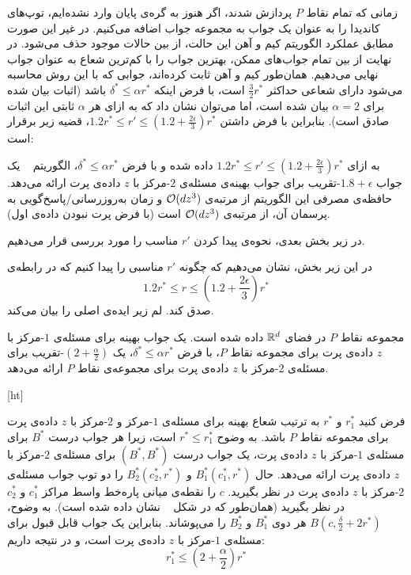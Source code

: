 زمانی که تمام نقاط $P$ پردازش شدند، اگر هنوز به گره‌ی پایان وارد نشده‌ایم، توپ‌های کاندیدا را به عنوان یک جواب به مجموعه جواب اضافه می‌کنیم. در غیر این صورت مطابق عملکرد الگوریتم کیم و آهن این حالت، از بین حالات موجود حذف می‌شود. در نهایت از بین تمام جواب‌های ممکن، بهترین جواب را با کم‌ترین شعاع به عنوان جواب نهایی می‌دهیم. همان‌طور کیم و آهن  ثابت کرده‌اند، جوابی که با این روش محاسبه می‌شود دارای شعاعی حداکثر $\frac{3}{2}r^*$ است، با فرض اینکه $\delta^* \leq \alpha r^*$ باشد (اثبات بیان شده برای $\alpha = 2$ بیان شده است، اما می‌توان نشان داد که به ازای هر $\alpha$ ثابتی این اثبات صادق است). بنابراین با فرض داشتن $1.2r^* \leq r' \leq (1.2 + \frac{2\epsilon}{3})r^*$، قضیه زیر برقرار است:


به ازای $1.2r^* \leq r' \leq (1.2 + \frac{2\epsilon}{3})r^*$ داده شده و با فرض $\delta^* \leq \alpha r^*$، الگوریتم ~ یک جواب $1.8 + \epsilon$-تقریب برای جواب بهینه‌ی مسئله‌ی $2$-مرکز با $z$ داده‌ی پرت ارائه می‌دهد. حافظه‌ی مصرفی این الگوریتم از مرتبه‌ی $\mathcal{O}(dz^3)$ و زمان به‌رو‌زرسانی/پاسخ‌گویی به پرسمان آن، از مرتبه‌ی $\mathcal{O}(dz^3)$ است (با فرض پرت نبودن داده‌ی اول).


در زیر بخش بعدی، نحوه‌ی پیدا کردن $r'$ مناسب را مورد بررسی قرار می‌دهیم.


در این زیر بخش، نشان می‌دهیم که چگونه $r'$ مناسبی را پیدا کنیم که در رابطه‌ی 
$$1.2r^* \leq r \leq (1.2 + \frac{2\epsilon}{3})r^*$$
صدق کند. لم زیر ایده‌ی اصلی را بیان می‌کند.

مجموعه نقاط $P$ در فضای $\mathbb{R}^d$ داده شده است. یک جواب بهینه برای مسئله‌ی $1$-مرکز با $z$ داده‌ی پرت برای مجموعه نقاط $P$، با فرض $\delta^* \leq \alpha r^*$، یک $(2 + \frac{\alpha}{2})$-تقریب برای مسئله‌ی $2$-مرکز با $z$ داده‌ی پرت برای مجموعه‌ی نقاط $P$ ارائه می‌دهد.

[ht]


فرض کنید $r_1^*$ و $r^*$ به ترتیب شعاع بهینه برای مسئله‌ی $1$-مرکز و $2$-مرکز با $z$ داده‌ی پرت برای مجموعه نقاط $P$ باشد. به وضوح $r^* \leq r_1^*$ است، زیرا هر جواب درست $B^*$ برای مسئله‌ی $1$-مرکز با $z$ داده‌ی پرت، یک جواب درست $(B^*, B^*)$ برای مسئله‌‌ی $2$-مرکز با $z$ داده‌ی پرت ارائه می‌دهد. حال $B_1^*(c_1^*, r^*)$ و $B_2^*(c_2^*, r^*)$ را دو توپ جواب مسئله‌ی $2$-مرکز با $z$ داده‌ی پرت در نظر بگیرید.  $c$ را نقطه‌ی میانی پاره‌خط واسط مراکز $c_1^*$ و $c_2^*$ در نظر بگیرید (همان‌طور که در شکل ~ نشان داده شده است). به وضوح، $B(c, \frac{\delta}{2} + 2r^*)$ هر دوی $B_1^*$ و $B_2^*$ را می‌پوشاند. بنابراین یک جواب قابل قبول برای مسئله‌ی $1$-مرکز با $z$ داده‌ی پرت است، و در نتیجه داریم:
$$r_1^* \leq (2 + \frac{\alpha}{2})r^*$$ 

